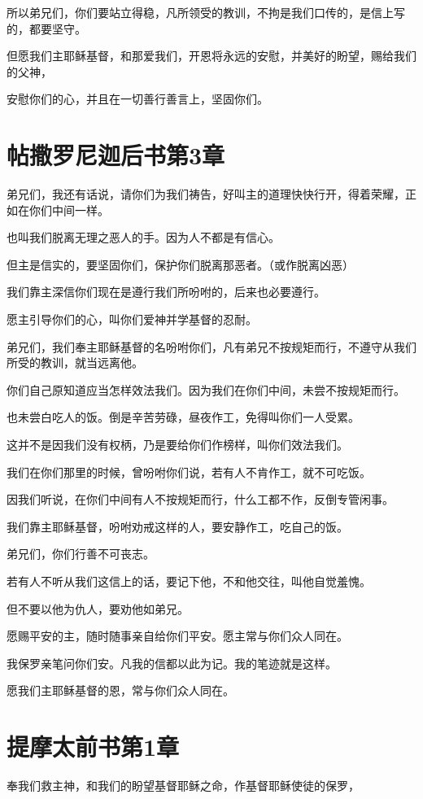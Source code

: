 \documentclass[12pt,oneside]{book}
\begin{document}
所以弟兄们，你们要站立得稳，凡所领受的教训，不拘是我们口传的，是信上写的，都要坚守。

但愿我们主耶稣基督，和那爱我们，开恩将永远的安慰，并美好的盼望，赐给我们的父神，

安慰你们的心，并且在一切善行善言上，坚固你们。

\chapter{帖撒罗尼迦后书第3章}
弟兄们，我还有话说，请你们为我们祷告，好叫主的道理快快行开，得着荣耀，正如在你们中间一样。

也叫我们脱离无理之恶人的手。因为人不都是有信心。

但主是信实的，要坚固你们，保护你们脱离那恶者。（或作脱离凶恶）

我们靠主深信你们现在是遵行我们所吩咐的，后来也必要遵行。

愿主引导你们的心，叫你们爱神并学基督的忍耐。

弟兄们，我们奉主耶稣基督的名吩咐你们，凡有弟兄不按规矩而行，不遵守从我们所受的教训，就当远离他。

你们自己原知道应当怎样效法我们。因为我们在你们中间，未尝不按规矩而行。

也未尝白吃人的饭。倒是辛苦劳碌，昼夜作工，免得叫你们一人受累。

这并不是因我们没有权柄，乃是要给你们作榜样，叫你们效法我们。

我们在你们那里的时候，曾吩咐你们说，若有人不肯作工，就不可吃饭。

因我们听说，在你们中间有人不按规矩而行，什么工都不作，反倒专管闲事。

我们靠主耶稣基督，吩咐劝戒这样的人，要安静作工，吃自己的饭。

弟兄们，你们行善不可丧志。

若有人不听从我们这信上的话，要记下他，不和他交往，叫他自觉羞愧。

但不要以他为仇人，要劝他如弟兄。

愿赐平安的主，随时随事亲自给你们平安。愿主常与你们众人同在。

我保罗亲笔问你们安。凡我的信都以此为记。我的笔迹就是这样。

愿我们主耶稣基督的恩，常与你们众人同在。

\chapter{提摩太前书第1章}
奉我们救主神，和我们的盼望基督耶稣之命，作基督耶稣使徒的保罗，
\end{document}
